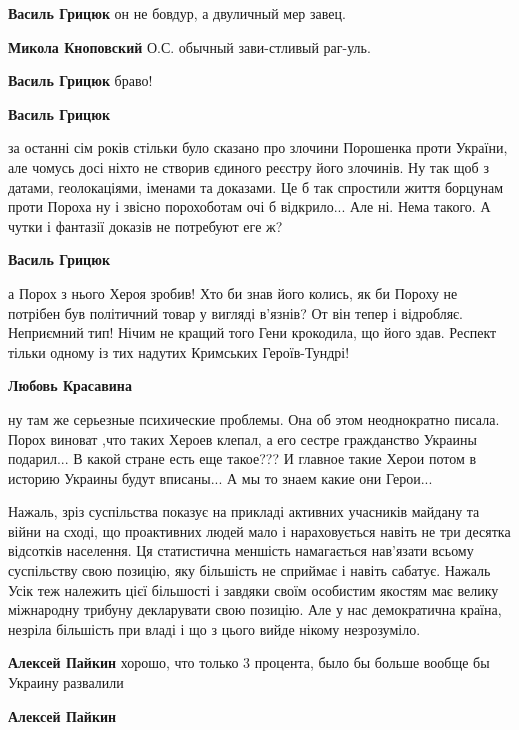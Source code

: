 \begin{itemize}
\begin{itemize}
\textbf{Василь Грицюк} он не бовдур, а двуличный мер завец.

\textbf{Микола Кноповский} О.С. обычный зави-стливый раг-уль.

\textbf{Василь Грицюк} браво!

\textbf{Василь Грицюк} 

за останні сім років стільки було сказано про злочини Порошенка проти України,
але чомусь досі ніхто не створив єдиного реєстру його злочинів. Ну так щоб з
датами, геолокаціями, іменами та доказами. Це б так спростили життя борцунам
проти Пороха ну і звісно порохоботам очі б відкрило... Але ні. Нема такого. А
чутки і фантазії доказів не потребуют еге ж?


\textbf{Василь Грицюк} 

а Порох з нього Хероя зробив! Хто би знав його колись, як би Пороху не потрібен
був політичний товар у вигляді в'язнів? От він тепер і відробляє. Неприємний
тип! Нічим не кращий того Гени крокодила, що його здав. Респект тільки одному із
тих надутих Кримських Героїв-Тундрі!

\textbf{Любовь Красавина} 

ну там же серьезные психические проблемы. Она об этом неоднократно писала. Порох
виноват ,что таких Хероев клепал, а его сестре гражданство Украины подарил... В
какой стране есть еще такое??? И главное такие Херои потом в историю Украины
будут вписаны... А мы то знаем какие они Герои...

\end{itemize} %


Нажаль, зріз суспільства показує на прикладі активних учасників майдану та
війни на сході, що проактивних людей мало і нараховується навіть не три десятка
відсотків населення. Ця статистична меншість намагається нав'язати всьому
суспільству свою позицію, яку більшість не сприймає і навіть сабатує. Нажаль
Усік теж належить цієї більшості і завдяки своїм особистим якостям має велику
міжнародну трибуну декларувати свою позицію. Але у нас демократична країна,
незріла більшість при владі і що з цього вийде нікому незрозуміло.

\begin{itemize} %
\textbf{Алексей Пайкин} хорошо, что только 3 процента, было бы больше вообще бы Украину развалили

\textbf{Алексей Пайкин} 


\end{itemize}
\end{itemize}
